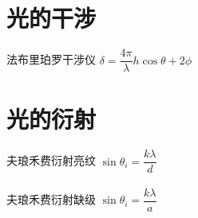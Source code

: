 \documentclass{article}
\begin{document}
\begin{multicols}{2}
\section{光的干涉}

法布里珀罗干涉仪 $\delta = \dfrac{4 \pi}{\lambda} h \cos \theta + 2 \phi $

\section{光的衍射}

夫琅禾费衍射亮纹 $\sin \theta_i = \dfrac{k \lambda}{d} $
\\\\
夫琅禾费衍射缺级 $\sin \theta_i = \dfrac{k \lambda}{a} $

\end{multicols}
\end{document}
